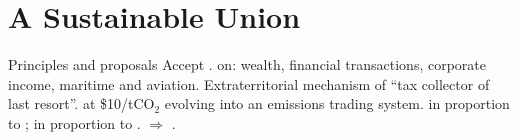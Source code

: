 \documentclass[aspectratio=169,xcolor=dvipsnames, 11pt,mathserif]{beamer}
\begin{document}
\section{A Sustainable Union}

\begin{frame}{Principles and proposals}
    \bbsp \ip Accept .
    \ip {} on: wealth, financial transactions, corporate income, maritime and aviation.
    \ip Extraterritorial mechanism of ``tax collector of last resort''.
    \ip {} at \$10/tCO$_\text{2}$ evolving into an emissions trading system.
    \ip {} in proportion to ;  in proportion to .
    \ip $\Rightarrow$ . 
    \ee
\end{frame}
\end{document}
